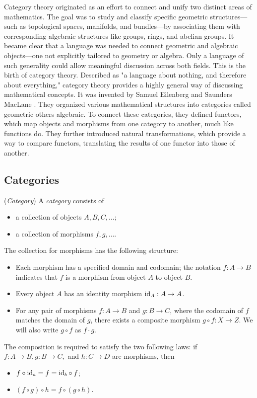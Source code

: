 Category theory originated as an effort to connect and unify two distinct areas of mathematics.  The goal was to study and classify specific geometric structures—such as topological spaces, manifolds, and bundles—by associating them with corresponding algebraic structures like groups, rings, and abelian groups. It became clear that a language was needed to connect geometric and algebraic objects—one not explicitly tailored to geometry or algebra. Only a language of such generality could allow meaningful discussion across both fields.  This is the birth of category theory.
Described as "a language about nothing, and therefore about everything," category theory provides a highly general way of discussing mathematical concepts.  It was invented by Samuel Eilenberg and Saunders MacLane \cite{eilenbergGeneralTheoryNatural1945}. They organized various mathematical structures into categories called geometric others algebraic. To connect these categories, they defined functors, which map objects and morphisms from one category to another, much like functions do. They further introduced natural transformations, which provide a way to compare functors, translating the results of one functor into those of another. \cite{yanofskyMonoidalCategoryTheory2024}


\subsection{Categories}

\begin{definition} (\emph{Category})
   A \emph{category} consists of
   \begin{itemize}
    \item a collection of objects $A, B, C, \ldots$;
    \item a collection of morphisms $f, g, \ldots $.
   \end{itemize}
    The collection for morphisms has the following structure:
    \begin{itemize}
      \item Each morphism has a specified domain and codomain; the notation $ f : A \to B $ indicates that $ f $ is a morphism from object $ A $ to object $ B $.  
       \item Every object $ A $ has an identity morphism $ \mathrm{id}_A : A \to A $.  
      \item For any pair of morphisms $ f : A \to B $ and $ g : B \to C $, where the codomain of $ f $ matches the domain of $ g $, there exists a composite morphism $ g \circ f : X \to Z $. We will also write $g \circ f$ as $f \cdot g$.
    \end{itemize}

     The composition is required to satisfy the two following laws: if $f : A \to B, g : B \to C,$ and $h:C \to D$ are morphisms, then
     \begin{itemize}
      \item  $f \circ \mathrm{id}_a = f = \mathrm{id}_b \circ f$;
      \item  $  (f \circ g) \circ h = f \circ (g \circ h) $.
     \end{itemize}
\end{definition}



